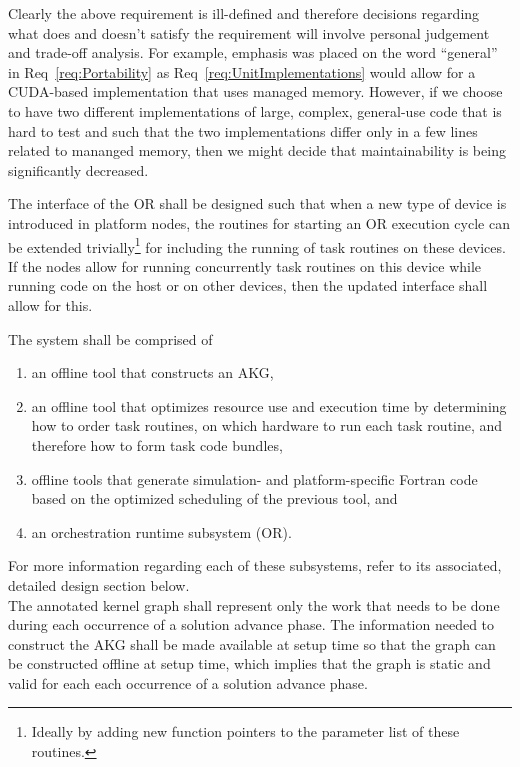 \documentclass{article}
\newcommand{\spelledoutAKG}  {annotated kernel graph\xspace}
\newcommand{\shortAKG}   {AKG\xspace}
\newcommand{\shortOR}   {OR\xspace}
\newcommand{\AKG}    {\shortAKG}
\newcommand{\OR}        {\shortOR}
\newcommand{\taskcodebundles}    {task code bundles\xspace}
\newcommand{\taskroutine}        {task routine\xspace}
\newcommand{\taskroutines}       {task routines\xspace}
\begin{document}
Clearly the above requirement is ill-defined and therefore decisions regarding
what does and doesn't satisfy the requirement will involve personal judgement
and trade-off analysis.  For example, emphasis was placed on the word
``general'' in Req~\ref{req:Portability} as Req~\ref{req:UnitImplementations}
would allow for a CUDA-based implementation that uses managed memory.  However,
if we choose to have two different implementations of large, complex,
general-use code that is hard to test and such that the two implementations differ
only in a few lines related to mananged memory, then we might decide that
maintainability is being significantly decreased.

\begin{req}
The interface of the \OR shall be designed such  that when a new type of
device is introduced in platform nodes, the routines for starting an \OR
execution cycle can be extended trivially\footnote{Ideally by adding new function
pointers to the parameter list of these routines.} for including the running of
\taskroutines on these devices.  If the nodes allow for running concurrently \taskroutines on
this device while running code on the host or on other devices, then the updated
interface shall allow for this.
\end{req}

\begin{req}
The system shall be comprised of
\begin{enumerate}
\item{an offline tool that constructs an \AKG,}
\item{an offline tool that optimizes resource use and execution time by
determining how to order \taskroutines, on which hardware to run each \taskroutine, and
therefore how to form \taskcodebundles,}
\item{offline tools that generate simulation- and platform-specific Fortran code
based on the optimized scheduling of the previous tool, and}
\item{an orchestration runtime subsystem (\shortOR).}
\end{enumerate}
\end{req}
For more information regarding each of these subsystems, refer to its
associated, detailed design section below.\\

The \spelledoutAKG shall represent only the work that needs to be done
during each occurrence of a solution advance phase. %
The information needed to construct the \AKG shall
be made available at setup time so that the graph can be constructed offline at
setup time, which implies that the graph is static and valid for each
each occurrence of a solution advance phase.\\
\end{document}
